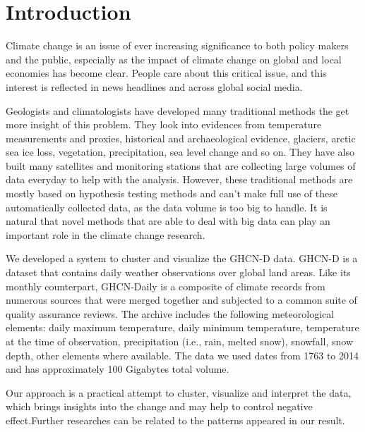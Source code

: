 \section{Introduction}
Climate change is an issue of ever increasing significance to both policy makers and the public, especially as the impact of climate change on global and local economies has become clear. People care about this critical issue, and this interest is reflected in news headlines and across global social media.

Geologists and climatologists have developed many traditional methods the get more insight of this problem. They look into evidences from temperature measurements and proxies, historical and archaeological evidence, glaciers, arctic sea ice loss, vegetation, precipitation, sea level change and so on. They have also built many satellites and monitoring stations that are collecting large volumes of data everyday to help with the analysis. However, these traditional methods are mostly based on hypothesis testing methods and can't make full use of these automatically collected data, as the data volume is too big to handle. It is natural that novel methods that are able to deal with big data can play an important role in the climate change research.

We developed a system to cluster and visualize the GHCN-D data\cite{GHCN-D}.
GHCN-D is a dataset that contains daily weather observations over global land areas.
Like its monthly counterpart, GHCN-Daily is a composite of climate records from
numerous sources that were merged together and subjected to a common suite of quality assurance reviews. The archive includes the following meteorological elements: daily maximum temperature, daily minimum temperature, temperature at the time of observation, precipitation (i.e., rain, melted snow), snowfall, snow depth, other elements where available. The data we used dates from 1763 to 2014 and has approximately 100 Gigabytes total volume.

Our approach is a practical attempt to cluster, visualize and interpret the data, which brings insights into the change and may help to control negative effect.Further researches can be related to the patterns appeared in our result.





